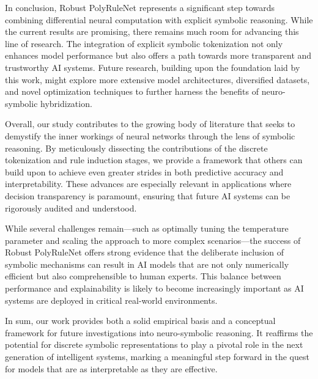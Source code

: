 \documentclass[11pt]{article}
\begin{document}
In conclusion, Robust PolyRuleNet represents a significant step towards combining differential neural computation with explicit symbolic reasoning. While the current results are promising, there remains much room for advancing this line of research. The integration of explicit symbolic tokenization not only enhances model performance but also offers a path towards more transparent and trustworthy AI systems. Future research, building upon the foundation laid by this work, might explore more extensive model architectures, diversified datasets, and novel optimization techniques to further harness the benefits of neuro-symbolic hybridization.

Overall, our study contributes to the growing body of literature that seeks to demystify the inner workings of neural networks through the lens of symbolic reasoning. By meticulously dissecting the contributions of the discrete tokenization and rule induction stages, we provide a framework that others can build upon to achieve even greater strides in both predictive accuracy and interpretability. These advances are especially relevant in applications where decision transparency is paramount, ensuring that future AI systems can be rigorously audited and understood. 

While several challenges remain—such as optimally tuning the temperature parameter and scaling the approach to more complex scenarios—the success of Robust PolyRuleNet offers strong evidence that the deliberate inclusion of symbolic mechanisms can result in AI models that are not only numerically efficient but also comprehensible to human experts. This balance between performance and explainability is likely to become increasingly important as AI systems are deployed in critical real-world environments.

In sum, our work provides both a solid empirical basis and a conceptual framework for future investigations into neuro-symbolic reasoning. It reaffirms the potential for discrete symbolic representations to play a pivotal role in the next generation of intelligent systems, marking a meaningful step forward in the quest for models that are as interpretable as they are effective.
\end{document}
